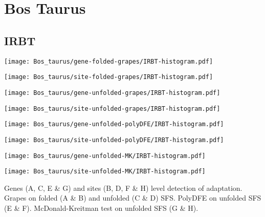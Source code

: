 \documentclass{article}
\begin{document}
\pagebreak
\section{Bos Taurus}

\subsection{IRBT}
\centering
\begin{minipage}{0.49\linewidth}
    \texttt{[image: Bos\_taurus/gene-folded-grapes/IRBT-histogram.pdf]}
\end{minipage}%
\hfill
\begin{minipage}{0.49\linewidth}
    \texttt{[image: Bos\_taurus/site-folded-grapes/IRBT-histogram.pdf]}
\end{minipage}
\hfill
\begin{minipage}{0.49\linewidth}
    \texttt{[image: Bos\_taurus/gene-unfolded-grapes/IRBT-histogram.pdf]}
\end{minipage}%
\hfill
\begin{minipage}{0.49\linewidth}
    \texttt{[image: Bos\_taurus/site-unfolded-grapes/IRBT-histogram.pdf]}
\end{minipage}
\hfill
\begin{minipage}{0.49\linewidth}
    \texttt{[image: Bos\_taurus/gene-unfolded-polyDFE/IRBT-histogram.pdf]}
\end{minipage}%
\hfill
\begin{minipage}{0.49\linewidth}
    \texttt{[image: Bos\_taurus/site-unfolded-polyDFE/IRBT-histogram.pdf]}
\end{minipage}
\hfill
\begin{minipage}{0.49\linewidth}
    \texttt{[image: Bos\_taurus/gene-unfolded-MK/IRBT-histogram.pdf]}
\end{minipage}%
\hfill
\begin{minipage}{0.49\linewidth}
    \texttt{[image: Bos\_taurus/site-unfolded-MK/IRBT-histogram.pdf]}
\end{minipage}
\hfill
\flushleft
Genes (A, C, E \& G) and sites (B, D, F \& H) level detection of adaptation.
Grapes on folded (A \& B) and unfolded (C \& D) SFS.
PolyDFE on unfolded SFS (E \& F).
McDonald-Kreitman test on unfolded SFS (G \& H).
\end{document}
